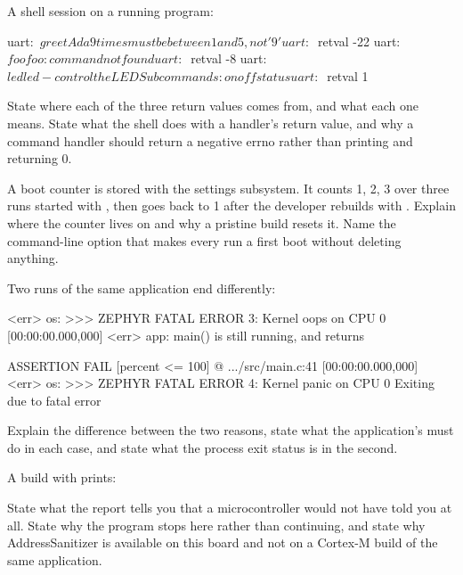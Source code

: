  A shell session on a running program:

\begin{console}
uart:~$ greet Ada 9
times must be between 1 and 5, not '9'
uart:~$ retval
-22
uart:~$ foo
foo: command not found
uart:~$ retval
-8
uart:~$ led
led - control the LED
Subcommands:
  on  off  status
uart:~$ retval
1
\end{console}

\noindent State where each of the three return values comes from, and what each one means. State
what the shell does with a handler's return value, and why a command handler should return a
negative errno rather than printing and returning 0. 

 A boot counter is stored with the settings subsystem. It counts 1, 2, 3 over three runs
started with , then goes back to 1 after the developer rebuilds with
. Explain where the counter lives on  and why a pristine build resets it.
Name the command-line option that makes every run a first boot without deleting anything. 

 Two runs of the same application end differently:

\begin{console}
[00:00:00.000,000] <err> os: >>> ZEPHYR FATAL ERROR 3: Kernel oops on CPU 0
[00:00:00.000,000] <err> app: main() is still running, and returns
\end{console}

\begin{console}
ASSERTION FAIL [percent <= 100] @ .../src/main.c:41
[00:00:00.000,000] <err> os: >>> ZEPHYR FATAL ERROR 4: Kernel panic on CPU 0
Exiting due to fatal error
\end{console}

\noindent Explain the difference between the two reasons, state what the application's
 must do in each case, and state what the process exit status is
in the second. 

 A build with  prints:


\noindent State what the report tells you that a microcontroller would not have told you at all.
State why the program stops here rather than continuing, and state why AddressSanitizer is available
on this board and not on a Cortex-M build of the same application. 
